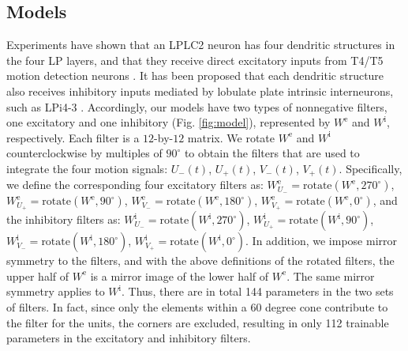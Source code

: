 \documentclass[pdftex,9pt,lineno]{elife}
\begin{document}
\subsection{Models}
Experiments have shown that an LPLC2 neuron has four dendritic structures in the four LP layers, and that they receive direct excitatory inputs from T4/T5 motion detection neurons \citep{maisak2013directional,klapoetke2017ultra}. It has been proposed that each dendritic structure also receives inhibitory inputs mediated by lobulate plate intrinsic interneurons, such as LPi4-3 \citep{klapoetke2017ultra}. Accordingly, our models have two types of nonnegative filters, one excitatory and one inhibitory (Fig. \ref{fig:model}), represented by $W^{\text{e}}$ and $W^{\text{i}}$, respectively. Each filter is a $12$-by-$12$ matrix. We rotate $W^{\text{e}}$ and $W^{\text{i}}$ counterclockwise by multiples of $90^{\circ}$ to obtain the filters that are used to integrate the four motion signals: $U_{-}(t)$, $U_{+}(t)$, $V_{-}(t)$, $V_{+}(t)$. Specifically, we define the corresponding four excitatory filters as: $W^{\text{e}}_{U_{-}}=\text{rotate}(W^{\text{e}},270^{\circ})$, $W^{\text{e}}_{U_{+}}=\text{rotate}(W^{\text{e}},90^{\circ})$, $W^{\text{e}}_{V_{-}}=\text{rotate}(W^{\text{e}},180^{\circ})$, $W^{\text{e}}_{V_{+}}=\text{rotate}(W^{\text{e}},0^{\circ})$, and the inhibitory filters as: $W^{\text{i}}_{U_{-}}=\text{rotate}(W^{\text{i}},270^{\circ})$, $W^{\text{i}}_{U_{+}}=\text{rotate}(W^{\text{i}},90^{\circ})$, $W^{\text{i}}_{V_{-}}=\text{rotate}(W^{\text{i}},180^{\circ})$, $W^{\text{i}}_{V_{+}}=\text{rotate}(W^{\text{i}},0^{\circ})$. In addition, we impose mirror symmetry to the filters, and with the above definitions of the rotated filters, the upper half of $W^{\text{e}}$ is a mirror image of the lower half of $W^{\text{e}}$. The same mirror symmetry applies to $W^{\text{i}}$. Thus, there are in total 144 parameters in the two sets of filters. In fact, since only the elements within a 60 degree cone contribute to the filter for the units, the corners are excluded, resulting in only 112 trainable parameters in the excitatory and inhibitory filters.
\end{document}
